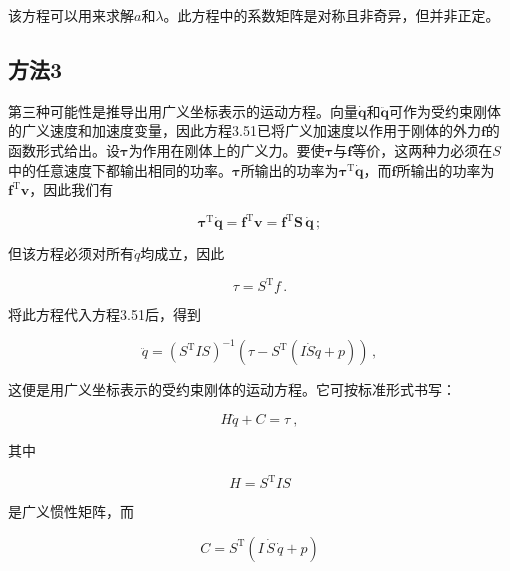 \documentclass[10pt,a4paper]{book}
\theoremstyle{thmstyle} %
\theoremstyle{defstyle} %
\theoremstyle{prostyle} %
\begin{document}
该方程可以用来求解$a$和$\lambda$。此方程中的系数矩阵是对称且非奇异，但并非正定。



\subsection{方法3}





第三种可能性是推导出用广义坐标表示的运动方程。向量$\dot{\boldsymbol{q}}$和$\ddot{\boldsymbol{q}}$可作为受约束刚体的广义速度和加速度变量，因此方程3.51已将广义加速度以作用于刚体的外力$\boldsymbol{f}$的函数形式给出。设$\boldsymbol{\tau}$为作用在刚体上的广义力。要使$\boldsymbol{\tau}$与$\boldsymbol{f}$等价，这两种力必须在$S$中的任意速度下都输出相同的功率。$\boldsymbol{\tau}$所输出的功率为$\boldsymbol{\tau}^{\mathrm{T}} \dot{\boldsymbol{q}}$，而$\boldsymbol{f}$所输出的功率为$\boldsymbol{f}^{\mathrm{T}} \boldsymbol{v}$，因此我们有



$$
\boldsymbol { \tau } ^{\mathrm { T} } \dot { \boldsymbol { q } } = \boldsymbol { f } ^{\mathrm { T} } \boldsymbol { v } = \boldsymbol { f } ^{\mathrm { T} } \boldsymbol { S } \, \dot { \boldsymbol { q } } \, ;
$$



但该方程必须对所有$\dot{q}$均成立，因此



$$
\tau = S ^{\mathrm { T} } f \, .
$$



将此方程代入方程3.51后，得到



$$
\ddot { q } = ( S ^{\mathrm { T} } I S ) ^{- 1} ( \tau - S ^{\mathrm { T} } ( I \dot { S } \dot { q } + p ) ) \, ,
$$



这便是用广义坐标表示的受约束刚体的运动方程。它可按标准形式书写：



$$
H \ddot { q } + C = \tau \ ,
$$



其中



$$
H = S ^{\mathrm { T} } I S
$$



是广义惯性矩阵，而



$$
C = S ^{\mathrm { T} } ( I \, \dot { S } \, \dot { q } + p )
$$
\end{document}
